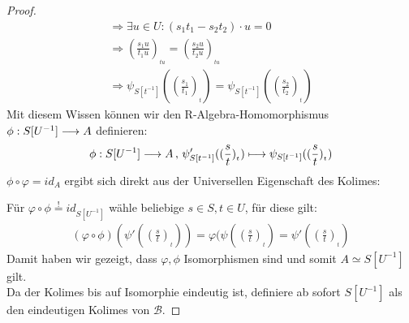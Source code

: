 \documentclass[10pt,a4paper]{report}
\newcommand{\functionfront}[3]{\nolinebreak{#1:#2 \longrightarrow #3}}
\newcommand{\function}[5]{\nolinebreak{#1:#2 \longrightarrow #3 \, , \, #4 \longmapsto #5}}
\newcommand{\lok}[2]{#1 [#2^{-1}]}
\newcommand{\loke}[3]{(\frac{#1}{#2})_{_{#3}}}
\newcommand*{\defshow}{\stackrel{!}{=}}
\begin{document}
\begin{proof}
\begin{align*}
\Rightarrow  \exists u \in U: (s_1t_1 - s_2t_2) \cdot u = 0\\
\Rightarrow  \loke{s_1u}{t_1u}{tu} = \loke{s_2u}{t_2u}{tu}\\
\Rightarrow  \psi_{\lok{S}{t}}(\loke{s_1}{t_1}{t}) = \psi_{\lok{S}{t}}(\loke{s_2}{t_2}{t})
\end{align*}
Mit diesem Wissen können wir den R-Algebra-Homomorphismus $\functionfront{\phi}{\lok{S}{U}}{A}$ definieren:
\begin{gather*}
\function{\phi}{\lok{S}{U}}{A}{\psi'_{\lok{S}{t}}(\loke{s}{t}{t})}{\psi_{\lok{S}{t}}(\loke{s}{t}{t})}
\end{gather*}
$\phi \circ \varphi = id_A$ ergibt sich direkt aus der Universellen Eigenschaft des Kolimes:
\begin{center}
\end{center}
Für $\varphi \circ \phi \defshow id_{\lok{S}{U}}$ wähle beliebige $s \in S , t \in U$, für diese gilt:
\begin{gather*}
(\varphi \circ \phi)(\psi'(\loke{s}{t}{t})) =
 \varphi (\psi(\loke{s}{t}{t}) =
  \psi'(\loke{s}{t}{t})
\end{gather*}
Damit haben wir gezeigt, dass $\varphi,\phi$ Isomorphismen sind und somit $A \simeq \lok{S}{U}$ gilt.\\
Da der Kolimes bis auf Isomorphie eindeutig ist, definiere ab sofort $\lok{S}{U}$ als den eindeutigen Kolimes von $\mathcal{B}$.
 \end{proof}
\end{document}
